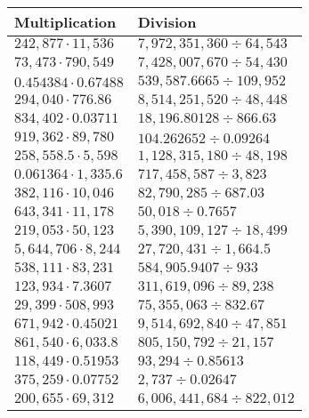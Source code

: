 \begin{longtable}[]{@{}ll@{}}
\toprule
Multiplication & Division\tabularnewline
\midrule
\endhead
\(242,877\cdot11,536\) & \(7,972,351,360 ÷64,543\)\tabularnewline
\(73,473\cdot790,549\) & \(7,428,007,670÷54,430\)\tabularnewline
\(0.454384\cdot0.67488\) & \(539,587.6665÷109,952\)\tabularnewline
\(294,040\cdot776.86\) & \(8,514,251,520÷48,448\)\tabularnewline
\(834,402\cdot0.03711\) & \(18,196.80128÷866.63\)\tabularnewline
\(919,362\cdot89,780\) & \(104.262652÷0.09264\)\tabularnewline
\(258,558.5\cdot5,598\) & \(1,128,315,180÷48,198\)\tabularnewline
\(0.061364\cdot1,335.6\) & \(717,458,587÷3,823\)\tabularnewline
\(382,116\cdot10,046\) & \(82,790,285÷687.03\)\tabularnewline
\(643,341\cdot11,178\) & \(50,018÷0.7657\)\tabularnewline
\(219,053\cdot50,123\) & \(5,390,109,127÷18,499\)\tabularnewline
\(5,644,706\cdot8,244\) & \(27,720,431÷1,664.5\)\tabularnewline
\(538,111\cdot83,231\) & \(584,905.9407÷933\)\tabularnewline
\(123,934\cdot7.3607\) & \(311,619,096÷89,238\)\tabularnewline
\(29,399\cdot508,993\) & \(75,355,063÷832.67\)\tabularnewline
\(671,942\cdot0.45021\) & \(9,514,692,840÷47,851\)\tabularnewline
\(861,540\cdot6,033.8\) & \(805,150,792÷21,157\)\tabularnewline
\(118,449\cdot0.51953\) & \(93,294÷0.85613\)\tabularnewline
\(375,259\cdot0.07752\) & \(2,737÷0.02647\)\tabularnewline
\(200,655\cdot69,312\) & \(6,006,441,684÷822,012\)\tabularnewline
\bottomrule
\end{longtable}
